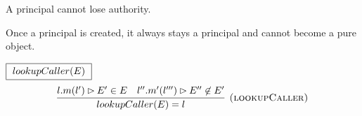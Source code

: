 \documentclass{llncs}
\newcommand{\keywadj}[1]{\mathtt{#1}}
\newcommand{\keyw}[1]{\keywadj{#1}~}
\begin{document}
%
%
%
%
%  


\vspace{8pt}

\begin{theorem}
A principal cannot lose authority.
\end{theorem}

\begin{corollary}
Once a principal is created, it always stays a principal and cannot become a pure object.
\end{corollary}

\vspace{30pt}

$\fbox{$~lookupCaller(E)~$}$
\[
\begin{array}{c}
\infer[\textsc{(lookupCaller)}]
  {lookupCaller(E) = l}
  {l.m(l') \rhd E' \in E & l''.m'(l''') \rhd E'' \not\in E'}\\[5ex]

\end{array}
\]
\end{document}
